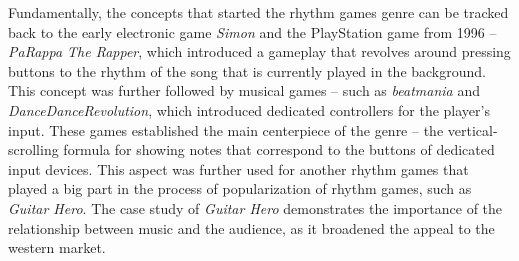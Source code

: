 Fundamentally, the concepts that started the rhythm games genre can be tracked back to the early electronic game \textit{Simon} and the PlayStation game from 1996 -- \textit{PaRappa The Rapper}, which introduced a gameplay that revolves around pressing buttons to the rhythm of the song that is currently played in the background. This concept was further followed by musical games -- such as \textit{beatmania} and \textit{DanceDanceRevolution}, which introduced dedicated controllers for the player's input. These games established the main centerpiece of the genre -- the vertical-scrolling formula for showing notes that correspond to the buttons of dedicated input devices. This aspect was further used for another rhythm games that played a big part in the process of popularization of rhythm games, such as \textit{Guitar Hero}. The case study of \textit{Guitar Hero} demonstrates the importance of the relationship between music and the audience, as it broadened the appeal to the western market.

